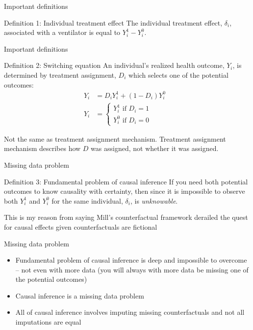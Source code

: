 \documentclass{beamer}
\begin{document}
\begin{frame}{Important definitions}

    \begin{block}{Definition 1: Individual treatment effect}
      The individual treatment effect,  $\delta_i$, associated with a ventilator is equal to $Y_i^1-Y_i^0$.
    \end{block}
\end{frame}


\begin{frame}{Important definitions}


    \begin{block}{Definition 2: Switching equation}
      An individual's realized health outcome, $Y_i$, is determined by treatment assignment, $D_i$ which selects one of the potential outcomes:
      \begin{eqnarray*}
        Y_i& = D_iY^1_i+(1-D_i)Y^0_i& \\
        Y_i& = \begin{cases}
          Y^1_i\text{ if }D_i=1 \\
          Y^0_i\text{ if }D_i=0
        \end{cases}
      \end{eqnarray*}
    \end{block}
    
    Not the same as treatment assignment mechanism.  Treatment assignment mechanism describes how $D$ was assigned, not whether it was assigned.

\end{frame}


\begin{frame}{Missing data problem}


    \begin{block}{Definition 3: Fundamental problem of causal inference}
      If you need both potential outcomes to know causality with certainty, then since it is impossible to observe both $Y_i^1$ and $Y_i^0$ for the same individual, $\delta_i$, is \emph{unknowable}.
    \end{block}

This is my reason from saying Mill's counterfactual framework derailed the quest for causal effects given counterfactuals are fictional
    
\end{frame}

\begin{frame}{Missing data problem}


    
      \begin{itemize}
    \item Fundamental problem of causal inference is deep and impossible to overcome -- not even with more data (you will always with more data be missing one of the potential outcomes)
    \item Causal inference is a missing data problem 
    \item All of causal inference involves imputing missing counterfactuals and not all imputations are equal
  \end{itemize}

    
\end{frame}
\end{document}

